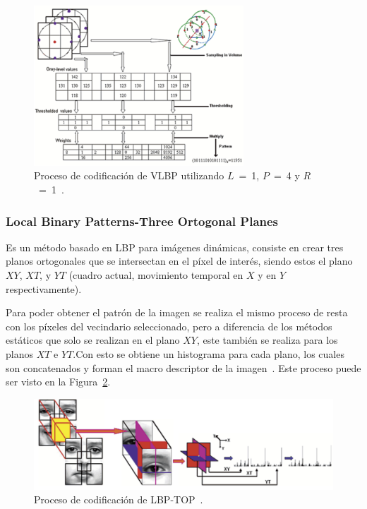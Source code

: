 \begin{figure}[tb]
  \centering
   \includegraphics[width=0.7\textwidth]{Figuras/vlbp.pdf}
  \caption{Proceso de codificación de VLBP utilizando $L$~=~1, $P$~=~4 y $R$~=~1~\cite{Zhao2007}.}
  \label{art:fig:vlbp}
\end{figure}


		\subsubsection{Local Binary Patterns-Three Ortogonal Planes}
		\label{sec:lbp-top}
		 Es un método basado en LBP para imágenes dinámicas, consiste en crear tres planos ortogonales que se intersectan en el píxel de interés, siendo estos el plano $XY$, $XT$, y $YT$ (cuadro actual, movimiento temporal en $X$ y en $Y$ respectivamente). 

Para poder obtener el patrón de la imagen se realiza el mismo proceso de resta con los píxeles del vecindario seleccionado, pero a diferencia de los métodos estáticos que solo se realizan en el plano $XY$, este también se realiza para los planos $XT$ e $YT$.\@ Con esto se obtiene un histograma para cada plano, los cuales son concatenados y forman el macro descriptor de la imagen~\cite{Zhao2007}. Este proceso puede ser visto en la Figura~\ref{art:fig:lbptop}.


\begin{figure}[tb]
  \centering
   \includegraphics[width=1\textwidth]{Figuras/lbptop.pdf}
  \caption{Proceso de codificación de LBP-TOP~\cite{Zhao2007}.}
  \label{art:fig:lbptop}
\end{figure}


